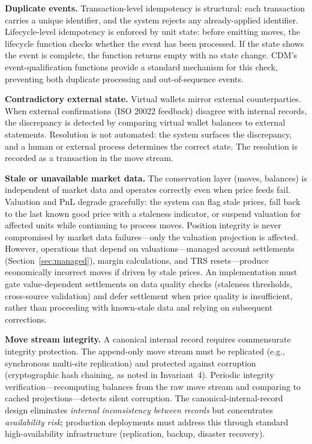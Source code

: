\documentclass[11pt,a4paper]{article}
\begin{document}
\noindent\textbf{Duplicate events.} Transaction-level idempotency is structural: each transaction carries a unique identifier, and the system rejects any already-applied identifier. Lifecycle-level idempotency is enforced by unit state: before emitting moves, the lifecycle function checks whether the event has been processed. If the state shows the event is complete, the function returns empty with no state change. CDM's event-qualification functions provide a standard mechanism for this check, preventing both duplicate processing and out-of-sequence events.

\noindent\textbf{Contradictory external state.} Virtual wallets mirror external counterparties. When external confirmations (ISO 20022 feedback) disagree with internal records, the discrepancy is detected by comparing virtual wallet balances to external statements. Resolution is not automated: the system surfaces the discrepancy, and a human or external process determines the correct state. The resolution is recorded as a transaction in the move stream.

\noindent\textbf{Stale or unavailable market data.} The conservation layer (moves, balances) is independent of market data and operates correctly even when price feeds fail. Valuation and PnL degrade gracefully: the system can flag stale prices, fall back to the last known good price with a staleness indicator, or suspend valuation for affected units while continuing to process moves. Position integrity is never compromised by market data failures---only the valuation projection is affected. However, operations that depend on valuations---managed account settlements (Section~\ref{sec:managed}), margin calculations, and TRS resets---produce economically incorrect moves if driven by stale prices. An implementation must gate value-dependent settlements on data quality checks (staleness thresholds, cross-source validation) and defer settlement when price quality is insufficient, rather than proceeding with known-stale data and relying on subsequent corrections.

\noindent\textbf{Move stream integrity.} A canonical internal record requires commensurate integrity protection. The append-only move stream must be replicated (e.g., synchronous multi-site replication) and protected against corruption (cryptographic hash chaining, as noted in Invariant~4). Periodic integrity verification---recomputing balances from the raw move stream and comparing to cached projections---detects silent corruption. The canonical-internal-record design eliminates \emph{internal inconsistency between records} but concentrates \emph{availability risk}; production deployments must address this through standard high-availability infrastructure (replication, backup, disaster recovery).
\end{document}
